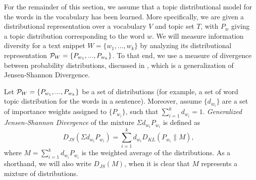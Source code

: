 
For the remainder of this section, we assume that a topic distributional 
model for the words in the vocabulary has been learned. More specifically,  
we are given a distributional representation over a vocabulary $V$ and
topic set $T$, with $P_w$ giving a topic distribution corresponding to the
word $w$. We will measure information diversity
for a text snippet $W=\{w_1,...,w_k\}$ by analyzing its 
distributional representation ${\mathcal P}_{W}=\{P_{w_1},...,P_{w_k}\}$. To
that end, we use a measure of divergence between probability
distributions, discussed in \cite{FugledeTopsoe}, which is a
generalization of Jensen-Shannon Divergence.

\bed\label{diversity}
Let ${\mathcal P}_{W}=\{P_{w_1},...,P_{w_k}\}$ be a set of
distributions (for example, a set of word topic distribution for the words in a sentence). Moreover, assume $\{d_{w_i}\}$  are a set of importance weights assigned to $\{P_{w_i}\}$, such that $\sum_{i=1}^kd_{w_i}=1$.
{\em Generalized Jensen-Shannon Divergence} of the mixture
$\Sigma d_{w_i}P_{w_i}$ is defined as
$$D_{JS}(\Sigma d_{w_i}P_{w_i})=\sum_{i=1}^k
d_{w_i}D_{KL}(P_{w_i}\|M),$$
where $M=\sum_{i=1}^kd_{w_i} P_{w_i}$ is the weighted average of the
distributions. As a shorthand, we will also write $D_{JS}(M)$, when
it is clear that $M$ represents a mixture of distributions.
\eed

